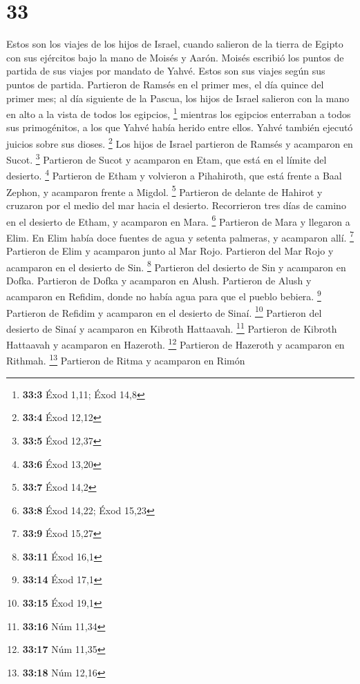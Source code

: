 \hypertarget{section-32}{%
\section{33}\label{section-32}}

 Estos son los viajes de los hijos de Israel, cuando
salieron de la tierra de Egipto con sus ejércitos bajo la mano de Moisés
y Aarón.  Moisés escribió los puntos de partida de sus
viajes por mandato de Yahvé. Estos son sus viajes según sus puntos de
partida.  Partieron de Ramsés en el primer mes, el día
quince del primer mes; al día siguiente de la Pascua, los hijos de
Israel salieron con la mano en alto a la vista de todos los egipcios,
\footnote{\textbf{33:3} Éxod 1,11; Éxod 14,8}  mientras
los egipcios enterraban a todos sus primogénitos, a los que Yahvé había
herido entre ellos. Yahvé también ejecutó juicios sobre sus dioses.
\footnote{\textbf{33:4} Éxod 12,12}  Los hijos de Israel
partieron de Ramsés y acamparon en Sucot. \footnote{\textbf{33:5} Éxod
  12,37}  Partieron de Sucot y acamparon en Etam, que está
en el límite del desierto. \footnote{\textbf{33:6} Éxod 13,20}
 Partieron de Etham y volvieron a Pihahiroth, que está
frente a Baal Zephon, y acamparon frente a Migdol. \footnote{\textbf{33:7}
  Éxod 14,2}  Partieron de delante de Hahirot y cruzaron
por el medio del mar hacia el desierto. Recorrieron tres días de camino
en el desierto de Etham, y acamparon en Mara. \footnote{\textbf{33:8}
  Éxod 14,22; Éxod 15,23}  Partieron de Mara y llegaron a
Elim. En Elim había doce fuentes de agua y setenta palmeras, y acamparon
allí. \footnote{\textbf{33:9} Éxod 15,27}  Partieron de
Elim y acamparon junto al Mar Rojo.  Partieron del Mar
Rojo y acamparon en el desierto de Sin. \footnote{\textbf{33:11} Éxod
  16,1}  Partieron del desierto de Sin y acamparon en
Dofka.  Partieron de Dofka y acamparon en Alush.
 Partieron de Alush y acamparon en Refidim, donde no
había agua para que el pueblo bebiera. \footnote{\textbf{33:14} Éxod
  17,1}  Partieron de Refidim y acamparon en el desierto
de Sinaí. \footnote{\textbf{33:15} Éxod 19,1}  Partieron
del desierto de Sinaí y acamparon en Kibroth Hattaavah. \footnote{\textbf{33:16}
  Núm 11,34}  Partieron de Kibroth Hattaavah y acamparon
en Hazeroth. \footnote{\textbf{33:17} Núm 11,35} 
Partieron de Hazeroth y acamparon en Rithmah. \footnote{\textbf{33:18}
  Núm 12,16}  Partieron de Ritma y acamparon en Rimón
